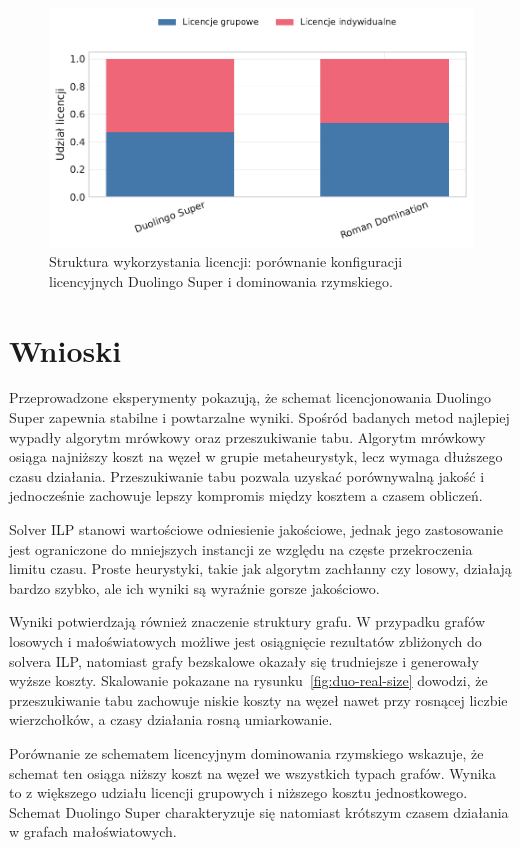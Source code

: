 \begin{figure}[H]
  \centering
  \includegraphics[width=0.6\linewidth]{assets/figures/benchmark/synthetic/license_mix_duo_vs_roman.pdf}
  \caption{Struktura wykorzystania licencji: porównanie konfiguracji licencyjnych Duolingo Super i dominowania rzymskiego.}
  \label{fig:duo-roman-license}
\end{figure}

\section{Wnioski}

Przeprowadzone eksperymenty pokazują, że schemat licencjonowania Duolingo Super zapewnia stabilne i powtarzalne wyniki. Spośród badanych metod najlepiej wypadły algorytm mrówkowy oraz przeszukiwanie tabu. Algorytm mrówkowy osiąga najniższy koszt na węzeł w grupie metaheurystyk, lecz wymaga dłuższego czasu działania. Przeszukiwanie tabu pozwala uzyskać porównywalną jakość i jednocześnie zachowuje lepszy kompromis między kosztem a czasem obliczeń.

Solver ILP stanowi wartościowe odniesienie jakościowe, jednak jego zastosowanie jest ograniczone do mniejszych instancji ze względu na częste przekroczenia limitu czasu. Proste heurystyki, takie jak algorytm zachłanny czy losowy, działają bardzo szybko, ale ich wyniki są wyraźnie gorsze jakościowo.

Wyniki potwierdzają również znaczenie struktury grafu. W przypadku grafów losowych i małoświatowych możliwe jest osiągnięcie rezultatów zbliżonych do solvera ILP, natomiast grafy bezskalowe okazały się trudniejsze i generowały wyższe koszty. Skalowanie pokazane na rysunku~\ref{fig:duo-real-size} dowodzi, że przeszukiwanie tabu zachowuje niskie koszty na węzeł nawet przy rosnącej liczbie wierzchołków, a czasy działania rosną umiarkowanie.

Porównanie ze schematem licencyjnym dominowania rzymskiego wskazuje, że schemat ten osiąga niższy koszt na węzeł we wszystkich typach grafów. Wynika to z większego udziału licencji grupowych i niższego kosztu jednostkowego. Schemat Duolingo Super charakteryzuje się natomiast krótszym czasem działania w grafach małoświatowych.
